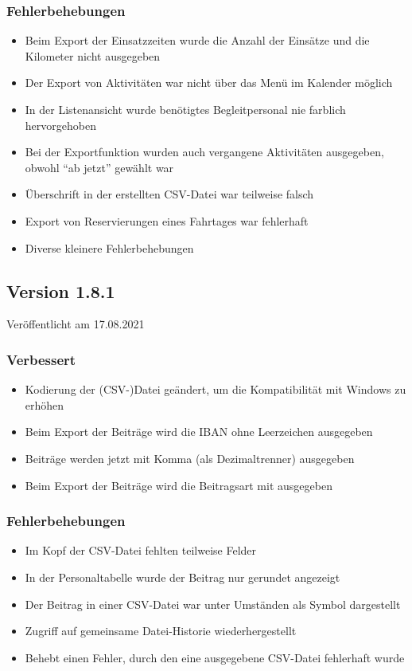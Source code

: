 \subsubsection{Fehlerbehebungen}
\begin{itemize}
  \item
  Beim Export der Einsatzzeiten wurde die Anzahl der Einsätze und die Kilometer nicht ausgegeben
  \item
  Der Export von Aktivitäten war nicht über das Menü im Kalender möglich
  \item
  In der Listenansicht wurde benötigtes Begleitpersonal nie farblich hervorgehoben
  \item
  Bei der Exportfunktion wurden auch vergangene Aktivitäten ausgegeben, obwohl "`ab jetzt"' gewählt war
  \item
  Überschrift in der erstellten CSV-Datei war teilweise falsch
  \item
  Export von Reservierungen eines Fahrtages war fehlerhaft
  \item
  Diverse kleinere Fehlerbehebungen
\end{itemize}

\subsection{Version 1.8.1}
\label{version:1:8:1}
Veröffentlicht am 17.08.2021
\subsubsection{Verbessert}
\begin{itemize}
  \item
  Kodierung der (CSV-)Datei geändert, um die Kompatibilität mit Windows zu erhöhen
  \item
  Beim Export der Beiträge wird die IBAN ohne Leerzeichen ausgegeben
  \item
  Beiträge werden jetzt mit Komma (als Dezimaltrenner) ausgegeben
  \item
  Beim Export der Beiträge wird die Beitragsart mit ausgegeben
\end{itemize}

\subsubsection{Fehlerbehebungen}
\begin{itemize}
  \item
  Im Kopf der CSV-Datei fehlten teilweise Felder
  \item
  In der Personaltabelle wurde der Beitrag nur gerundet angezeigt
  \item
  Der Beitrag in einer CSV-Datei war unter Umständen als Symbol dargestellt
  \item
  Zugriff auf gemeinsame Datei-Historie wiederhergestellt
  \item
  Behebt einen Fehler, durch den eine ausgegebene CSV-Datei fehlerhaft wurde
\end{itemize}


